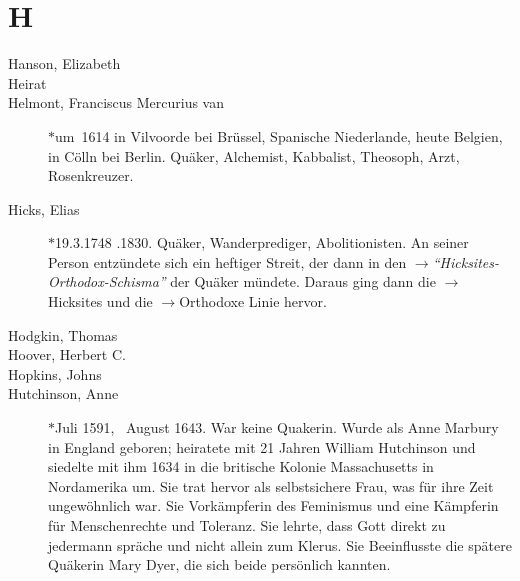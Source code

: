\section*{H}

\articlesize

\begin{description}

 \item[Hanson, Elizabeth]

 \item[Heirat]

 \item[Helmont, Franciscus Mercurius van] $\ast$um~1614 in Vilvoorde bei Brüssel, Spanische Niederlande, heute Belgien,  in Cölln bei Berlin. Quäker, Alchemist, Kabbalist, Theosoph, Arzt, Rosenkreuzer.

 \item[Hicks, Elias] $\ast$19.3.1748 .1830. Quäker, Wanderprediger, Abolitionisten. An seiner Person entzündete sich ein heftiger Streit, der dann in den  $\to$\textit{"`Hicksites-Orthodox-Schisma"'} der Quäker mündete. Daraus ging dann die $\to$Hicksites und die $\to$Orthodoxe Linie hervor.

 \item[Hodgkin, Thomas]

 \item[Hoover, Herbert C.]

 \item[Hopkins, Johns]

 \item[Hutchinson, Anne] $\ast$Juli 1591, \dag~August 1643. War keine Quakerin. Wurde als Anne Marbury in England geboren; heiratete mit 21 Jahren William Hutchinson und siedelte mit ihm 1634 in die britische Kolonie Massachusetts in Nordamerika um. Sie trat hervor als selbstsichere Frau, was für ihre Zeit ungewöhnlich war. Sie Vorkämpferin des Feminismus und eine Kämpferin für Menschenrechte und Toleranz. Sie lehrte, dass Gott direkt zu jedermann spräche und nicht allein zum Klerus. Sie Beeinflusste die spätere Quäkerin Mary Dyer, die sich beide persönlich kannten.


 \end{description}

\normalsize
